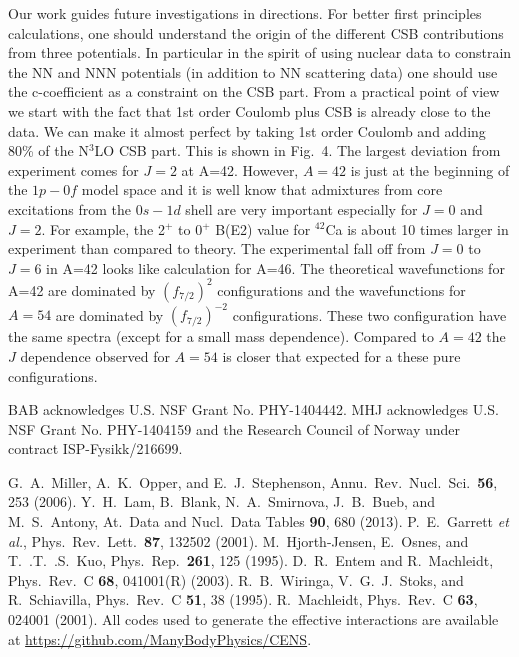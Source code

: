 \documentclass[twocolumn,aps,tightenlines,floatfix,showpacs]{revtex4}
\begin{document}
Our work guides future investigations in directions.
For better first principles calculations, one should
understand the origin of the
different CSB contributions from three potentials.
In particular in the spirit of using nuclear data to
constrain the NN and NNN potentials (in addition to NN scattering
data) one should use the c-coefficient as a constraint on the
CSB part. From a practical point of view we start with the
fact that 1st order Coulomb plus CSB is already close to the data.
We can make it almost perfect by taking 1st order Coulomb
and adding 80\% of the N$^3$LO CSB part. This is shown in Fig.~4.
The largest deviation from experiment comes for $  J=2  $ at A=42.
However, $  A=42  $ is just at the beginning of the $  1p-0f  $
model space and it is well know that admixtures from
core excitations from the
$  0s-1d  $ shell are very important especially for $  J=0  $ and $  J=2  $.
For example, the 2$^{ + }$ to 0$^{ + }$ B(E2) value for $^{42}$Ca is about 10 times
larger in experiment than compared to theory. The experimental
fall off from $  J=0  $ to $  J=6  $ in A=42 looks like calculation
for A=46. The theoretical wavefunctions for
A=42 are dominated by $  (f_{7/2})^{2}  $ configurations
and the wavefunctions for $  A=54  $ are dominated by
$  (f_{7/2})^{-2}  $ configurations. These two configuration
have the same spectra (except for a small mass dependence).
Compared to $  A=42  $ the
$  J  $ dependence observed for $  A=54  $ is closer that
expected for a these pure configurations.






BAB acknowledges U.S. NSF Grant No. PHY-1404442.
MHJ acknowledges U.S. NSF Grant No. PHY-1404159 and  the Research Council of
Norway under contract ISP-Fysikk/216699.

\begin{thebibliography}{99}
 G.~A.~Miller, A.~K.~Opper, and E.~J.~Stephenson, Annu.~Rev.~Nucl.~Sci.~{\bf 56}, 253 (2006).
 Y.~H.~Lam, B.~Blank, N.~A.~Smirnova, J.~B.~Bueb, and M.~S.~Antony, At.~Data and Nucl.~Data Tables {\bf 90}, 680 (2013). 
 P.~E.~Garrett {\em et al.}, Phys.~Rev.~Lett.~{\bf 87}, 132502 (2001). 
 M.~Hjorth-Jensen, E.~Osnes, and T.~.T.~.S.~Kuo, Phys.~Rep.~{\bf 261}, 125 (1995).
 D.~R.~Entem and R.~Machleidt, Phys.~Rev.~C {\bf 68}, 041001(R) (2003).
 R.~B.~Wiringa, V.~G.~J.~Stoks, and R.~Schiavilla, Phys.~Rev.~C {\bf 51}, 38 (1995).
 R.~Machleidt, Phys.~Rev.~C {\bf 63}, 024001 (2001).
 All codes used to generate the effective interactions are available at \url{ https://github.com/ManyBodyPhysics/CENS}.
\end{thebibliography}
\end{document}
